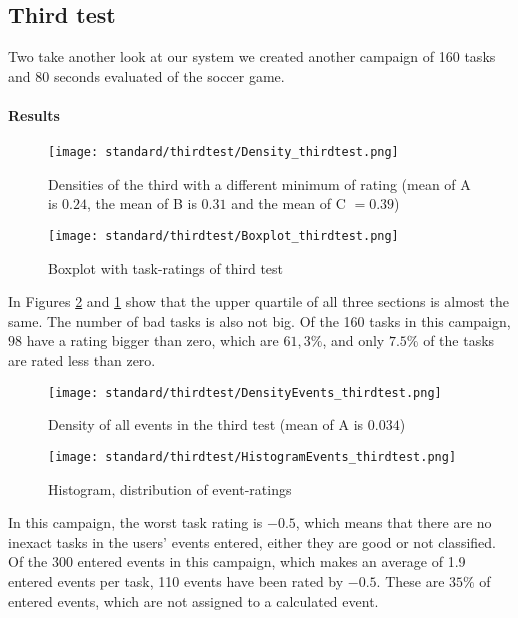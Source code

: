 \subsection{Third test}
Two take another look at our system we created another campaign of 160 tasks and 80 seconds evaluated of the soccer game.



\paragraph{Results}

\begin{figure}[H]
    \centering
    \texttt{[image: standard/thirdtest/Density\_thirdtest.png]}
    \caption{Densities of the third with a different minimum of rating (mean of A is $0.24$, the mean of B is $0.31$ and the mean of C $ = 0.39$)}
    \label{img:Density:thirdtest}
\end{figure}

\begin{figure}[H]
    \centering
    \texttt{[image: standard/thirdtest/Boxplot\_thirdtest.png]}
    \caption{Boxplot with task-ratings of third test}
    \label{img:Boxplot_thirdtest}
\end{figure}

In Figures \ref{img:Boxplot_thirdtest} and \ref{img:Density:thirdtest} show that the upper quartile of all three sections is almost the same. The number of bad tasks is also not big.
Of the 160 tasks in this campaign, $98$ have a rating bigger than zero, which are $61,3\%$, and only $7.5\%$ of the tasks are rated less than zero.

\begin{figure}[H]
    \centering
    \texttt{[image: standard/thirdtest/DensityEvents\_thirdtest.png]}
    \caption{Density of all events in the third test (mean of A is $0.034$)}
\end{figure}

\begin{figure}[H]
    \centering
    \texttt{[image: standard/thirdtest/HistogramEvents\_thirdtest.png]}
    \caption{Histogram, distribution of event-ratings}
\end{figure}

In this campaign, the worst task rating is $-0.5$, which means that there are no inexact tasks in the users' events entered, either they are good or not classified.
Of the 300 entered events in this campaign, which makes an average of 1.9 entered events per task, 110 events have been rated by $-0.5$. These are $35\%$ of entered events, which are not assigned to a calculated event.

